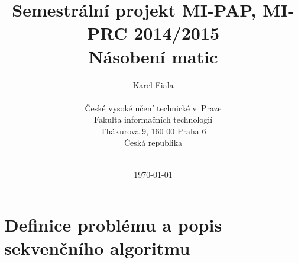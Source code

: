 \documentclass[12pt,a4paper]{article}
\begin{document}
\title{Semestrální projekt MI-PAP, MI-PRC 2014/2015\\
Násobení matic \\
\vspace{10px}}
\author{Karel Fiala \\
\vspace{10px} \\
\small České vysoké učení technické v~Praze\\
\small Fakulta informačních technologií\\
\small Thákurova 9, 160 00 Praha 6\\
\small Česká republika \\
\vspace{10px} \\
}
\date{\today}
\maketitle



%
%
%

\clearpage
\tableofcontents
\clearpage

\section{Definice problému a popis sekvenčního algoritmu}
\end{document}

